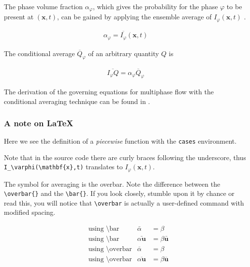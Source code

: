 The phase volume fraction $\alpha_\varphi$, which gives the probability for the phase $\varphi$ 
to be present at $(\mathbf{x},t)$, can be gained by applying the ensemble average of 
$I_\varphi(\mathbf{x},t)$ \cite{openCFD2005}.

\begin{gather}
	\alpha_\varphi = \overbar{I_\varphi}(\mathbf{x},t)
\end{gather}

The conditional average $\overbar{Q}_\varphi$ of an arbitrary quantity $Q$ is 

\begin{gather}
	\overbar{I_\varphi Q} = \alpha_\varphi \overbar{Q}_\varphi
\end{gather}

The derivation of the governing equations for multiphase flow with the conditional averaging 
technique can be found in \cite{marschallPhD,openCFD2005}.


%
%
%
%



\subsubsection*{A note on \LaTeX{}}

Here we see the definition of a \emph{piecewise} function with the \verb+cases+ environment.


Note that in the source code there are curly braces following the underscore, thus 
\verb+I_\varphi(\mathbf{x},t)+ translates to $I_\varphi(\mathbf{x},t)$.


The symbol for averaging is the overbar. Note the difference between the \verb+\overbar{}+ 
and the \verb+\bar{}+. If you look closely, stumble upon it by chance or read this, you will 
notice that \verb+\overbar+ is actually a user-defined command with modified spacing.

\begin{align}
	&\text{using \textbackslash{}bar} & \bar{\alpha} &= \beta \\ %
	&\text{using \textbackslash{}bar} & \bar{\alpha \mathbf{u}} &= \beta \bar{\mathbf{u}} \\ %
	&\text{using \textbackslash{}overbar} & \overbar{\alpha} &= \beta \\ %
	&\text{using \textbackslash{}overbar} & \overbar{\alpha \mathbf{u}} &= \beta \overbar{\mathbf{u}} \\ %
\end{align}

